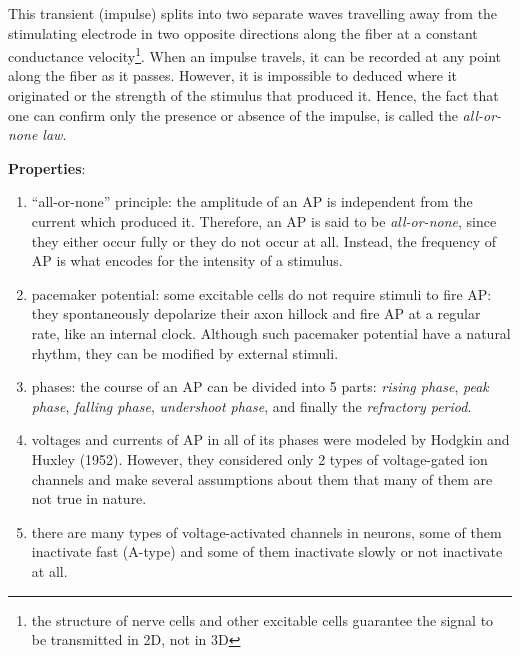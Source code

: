 This transient (impulse) splits into two separate waves travelling away
from the
stimulating electrode in two opposite directions along the fiber at a constant
conductance velocity\footnote{the structure of nerve cells and other excitable
cells guarantee the signal to be transmitted in 2D, not in 3D}.
When an impulse travels, it can be recorded at any point along the fiber as it
passes. However, it is impossible to deduced where it originated or the strength
of the stimulus that produced it. Hence, the fact that one can confirm only the
presence or absence of the impulse, is called the {\it all-or-none law}.








{\bf Properties}:
\begin{enumerate}
\item ``all-or-none'' principle: the amplitude of an AP is independent
  from the current which produced it. Therefore, an AP is said to be
  {\it all-or-none}, since they either occur fully or they do not
  occur at all. Instead, the frequency of AP is what encodes for the
  intensity of a stimulus.

\item pacemaker potential: some excitable cells do not require stimuli
  to fire AP: they spontaneously depolarize their axon hillock and
  fire AP at a regular rate, like an internal clock. Although such
  pacemaker potential have a natural rhythm, they can be modified by
  external stimuli.

\item phases: the course of an AP can be divided into 5 parts: {\it
    rising phase}, {\it peak phase}, {\it falling phase}, {\it
    undershoot phase}, and finally the {\it refractory period}.

\item voltages and currents of AP in all of its phases were modeled by
  Hodgkin and Huxley (1952). However, they considered only 2 types of
  voltage-gated ion channels and make several assumptions about them
  that many of them are not true in nature.

\item there are many types of voltage-activated  channels in
  neurons, some of them inactivate fast (A-type) and some of them
  inactivate slowly or not inactivate at all.
\end{enumerate}



